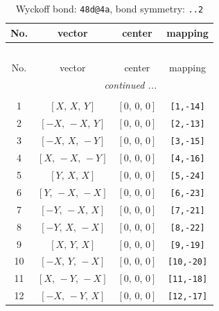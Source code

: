 \documentclass[fleqn,8pt]{jsarticle}
\begin{document}
\renewcommand{\arraystretch}{1.2}
\begin{longtable}{cccc}
\caption{Wyckoff bond: {\tt 48d@4a}, bond symmetry: {\tt ..2}}
 \\
 \hline \hline
No. & vector & center & mapping \\ \hline \endfirsthead

\multicolumn{3}{l}{\tablename\ \thetable{}} \\
 \hline \hline
No. & vector & center & mapping \\ \hline \endhead

 \hline \hline
\multicolumn{3}{r}{\footnotesize\it continued ...} \\ \endfoot

 \hline \hline
\multicolumn{3}{r}{} \\ \endlastfoot

1 & $\left[ X,\, X,\, Y \right]$ & $\left[ 0,\, 0,\, 0 \right]$ & {\tt [1,-14]} \\ \hline
2 & $\left[ - X,\, - X,\, Y \right]$ & $\left[ 0,\, 0,\, 0 \right]$ & {\tt [2,-13]} \\ \hline
3 & $\left[ - X,\, X,\, - Y \right]$ & $\left[ 0,\, 0,\, 0 \right]$ & {\tt [3,-15]} \\ \hline
4 & $\left[ X,\, - X,\, - Y \right]$ & $\left[ 0,\, 0,\, 0 \right]$ & {\tt [4,-16]} \\ \hline
5 & $\left[ Y,\, X,\, X \right]$ & $\left[ 0,\, 0,\, 0 \right]$ & {\tt [5,-24]} \\ \hline
6 & $\left[ Y,\, - X,\, - X \right]$ & $\left[ 0,\, 0,\, 0 \right]$ & {\tt [6,-23]} \\ \hline
7 & $\left[ - Y,\, - X,\, X \right]$ & $\left[ 0,\, 0,\, 0 \right]$ & {\tt [7,-21]} \\ \hline
8 & $\left[ - Y,\, X,\, - X \right]$ & $\left[ 0,\, 0,\, 0 \right]$ & {\tt [8,-22]} \\ \hline
9 & $\left[ X,\, Y,\, X \right]$ & $\left[ 0,\, 0,\, 0 \right]$ & {\tt [9,-19]} \\ \hline
10 & $\left[ - X,\, Y,\, - X \right]$ & $\left[ 0,\, 0,\, 0 \right]$ & {\tt [10,-20]} \\ \hline
11 & $\left[ X,\, - Y,\, - X \right]$ & $\left[ 0,\, 0,\, 0 \right]$ & {\tt [11,-18]} \\ \hline
12 & $\left[ - X,\, - Y,\, X \right]$ & $\left[ 0,\, 0,\, 0 \right]$ & {\tt [12,-17]} \\
\end{longtable}
\renewcommand{\arraystretch}{1.2}
\end{document}
